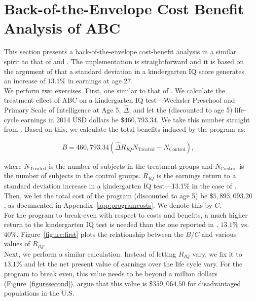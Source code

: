 
\section{Back-of-the-Envelope Cost Benefit Analysis of ABC} \label{appendix:back}

\noindent This section presents a back-of-the-envelope cost-benefit analysis in a similar spirit to that of \citet{Chetty_Friedman_etal_2010_HowDoesYour} and \citet{Kline-Walters_2015_NBER-Evaluating}. The implementation is straightforward and it is based on the argument of  \citet{Chetty_Friedman_etal_2010_HowDoesYour} that a standard deviation in a kindergarten IQ score generates an increase of $13.1\%$ in earnings at age 27.\\

\noindent We perform two exercises. First, one similar to that of \citet{Kline-Walters_2015_NBER-Evaluating}. We calculate the treatment effect of ABC on a kindergarten IQ test---Wechsler Preschool and Primary Scale of Intelligence at Age 5, $\widehat{\Delta}$, and let the (discounted to age 5) life-cycle earnings in 2014 USD dollars be $\$460,793.34$. We take this number straight from \citet{Kline-Walters_2015_NBER-Evaluating}. Based on this, we calculate the total benefits induced by the program as: 

\begin{equation}
B = 460,793.34 \left( \widehat{\Delta} R_{IQ}  N_{\text{Treated}}  -  N_{\text{Control}} \right) , 
\end{equation}

\noindent where $N_{\text{Treated}}$ is the number of subjects in the treatment groups and $N_{\text{Control}}$ is the number of subjects in the control groups. $R_{IQ}$ is the earnings return to a standard deviation increase in a kindergarten IQ test---13.1\% in the case of \citep{Chetty_Friedman_etal_2010_HowDoesYour}. Then, we let the total cost of the program (discounted to age 5) be $\$5,893,093.20$, as documented in Appendix~\ref{app:programcosts}. We denote this by $C$.\\ 

\noindent For the program to break-even with respect to costs and benefits, a much higher return to the kindergarten IQ test is needed than the one reported in \citep{Chetty_Friedman_etal_2010_HowDoesYour}, $13.1\%$ vs. $40\%$. Figure~\ref{figure:first} plots the relationship between the $B/C$ and various values of $R_{IQ}$.\\ 

\noindent Next, we perform a similar calculation. Instead of letting $R_{IQ}$ vary, we fix it to $13.1\%$ and let the net present value of earnings over the life cycle vary. For the program to break even, this value needs to be beyond a million dollars (Figure~\ref{figuresecond}). \citet{Kline-Walters_2015_NBER-Evaluating} argue that this value is $\$359,064.50$ for disadvantaged populations in the U.S.

